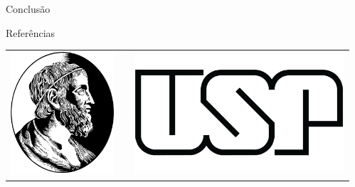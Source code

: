 \documentclass[final]{beamer}
\newlength{\sepwid}
\newlength{\onecolwid}
\begin{document}
\begin{frame}[t]
\begin{columns}[t]
\begin{column}{\onecolwid}
\begin{block}{Conclusão}
\end{block}


\begin{block}{Referências}

\nocite{*} %
\small{
}

\end{block}


\begin{center}
\begin{tabular}{ccc}
\includegraphics[width=0.2\linewidth]{IME.png} & \hfill & \includegraphics[width=0.4\linewidth]{USP.jpg}
\end{tabular}
\end{center}


\end{column} %

\begin{column}{\sepwid}\end{column} %

\end{columns} %

\end{frame} %
\end{document}
